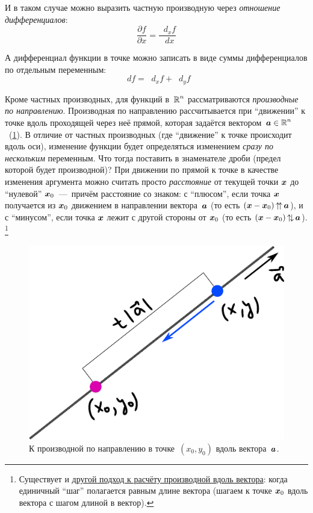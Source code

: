 \documentclass[a4paper,12pt]{article}
\DeclareMathOperator{\upups}{\uparrow\!\uparrow}
\DeclareMathOperator{\updowns}{\uparrow\!\downarrow}
\newcommand{\diff}{\mathop{}\!d}
\begin{document}
  И в таком случае можно выразить частную производную через \emph{отношение дифференциалов}:
  \[
    \frac{\partial f}{\partial x} = \frac{\diff_x f}{\diff x}
  \]

  А дифференциал функции в точке можно записать в виде суммы дифференциалов по отдельным переменным:
  \[
    \diff f = \diff_x f + \diff_y f
  \]

  Кроме частных производных, для функций в~$\operatorname{\mathbb R}^n$ рассматриваются \emph{производные по направлению}.
  Производная по направлению рассчитывается при ``движении'' к точке вдоль проходящей через неё прямой, которая задаётся вектором~$\bds a \hm\in \RR^n$~(\ref{fig:der-on-vec}).
  В отличие от частных производных (где ``движение'' к точке происходит вдоль оси), изменение функции будет определяться изменением \emph{сразу по нескольким} переменным.
  Что тогда поставить в знаменателе дроби (предел которой будет производной)?
  При движении по прямой к точке в качестве изменения аргумента можно считать просто \emph{расстояние} от текущей точки $\boldsymbol x$ до ``нулевой'' $\boldsymbol x_0$~---~причём расстояние со знаком: с ``плюсом'', если точка $\boldsymbol x$ получается из $\boldsymbol x_0$ движением в направлении вектора~$\boldsymbol a$ (то есть
  $(\bds x \hm- \bds x_0) \hm{\upups} \bds a$),
  и с ``минусом'', если точка $\boldsymbol x$ лежит с другой стороны от $\boldsymbol x_0$ (то есть $(\bds x \hm- \bds x_0) \hm{\updowns} \bds a$).
  \footnote{
    Существует и \href{https://en.wikipedia.org/wiki/Directional_derivative\#Definition}{другой подход к расчёту производной вдоль вектора}: когда единичный ``шаг'' полагается равным длине вектора (шагаем к точке $\boldsymbol x_0$ вдоль вектора с шагом длиной в вектор).
  }

  \begin{figure}[ht]
    \centering
    \includegraphics[width=0.5\linewidth]{images/der-on-vec}
    
    \caption{
      К производной по направлению в точке~$(x_0, y_0)$ вдоль вектора~$\boldsymbol a$.
    }
    \label{fig:der-on-vec}
  \end{figure}
\end{document}
